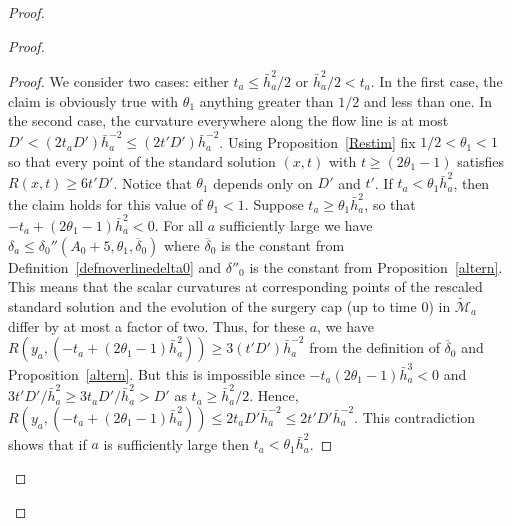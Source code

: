 \begin{proof}
\begin{proof}
\begin{proof}
We consider two cases: either $t_a\le \bar h_a^2/2$ or $\bar
h_a^2/2<t_a$. In the first case, the claim is obviously true with
$\theta_1$ anything greater than $1/2$ and less than one. In the
second case, the curvature everywhere along the flow line is at most
$ D'<(2t_aD')\bar h_a^{-2}\le (2t'D')\bar h_a^{-2}$. Using
Proposition~\ref{Restim} fix $1/2<\theta_1<1$ so that every point of
the standard solution $(x,t)$ with $t\ge (2\theta_1-1)$ satisfies
$R(x,t)\ge 6t'D'$. Notice that  $\theta_1$ depends only on $D'$ and
$t'$. If $t_a<\theta_1\bar h_a^2$, then the claim holds for this
value of $\theta_1<1$. Suppose $t_a\ge \theta_1\bar h_a^2$, so
that $-t_a+(2\theta_1-1)\bar h_a^2<0$. For all  $a$
sufficiently large we have $\delta_a\le \delta_0''(A_0+5,
\theta_1,\overline \delta_0)$ where $\overline\delta_0$ is the constant
from Definition~\ref{defnoverlinedelta0} and $\delta''_0$ is the constant
from Proposition~\ref{altern}.
This means that the scalar curvatures
at corresponding points of the rescaled standard solution and the
evolution of the surgery cap (up to time $0$) in $\widetilde{\mathcal M}_a$
differ by at most a factor of two. Thus, for these $a$, we have
$R(y_a,(-t_a+(2\theta_1-1)\bar h_a^{2}))\ge 3(t'D')\bar h_a^{-2}$
from the definition of $\overline\delta_0$ and
Proposition~\ref{altern}. But this is impossible since
$-t_a(2\theta_1-1)\bar h_a^3<0$ and $3t'D'/\bar h_a^2\ge 3t_aD'/\bar h_a^2>D'$ as
 $t_a\ge \bar h_a^2/2$. Hence,
$R(y_a,(-t_a+(2\theta_1-1)\bar h_a^2))\le 2t_aD'\bar
h_a^{-2}\le 2t'D'\bar h_a^{-2}$. This contradiction
shows that if $a$ is sufficiently large then $t_a<\theta_1\bar
h_a^2$.
\end{proof}


\end{proof}
\end{proof}

